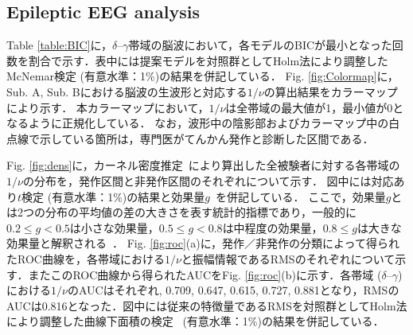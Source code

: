 \documentclass[journal]{IEEEtran}
\begin{document}
\subsection{Epileptic EEG analysis}
Table \ref{table:BIC}に，$\delta$--$\gamma$帯域の脳波において，各モデルのBICが最小となった回数を割合で示す．表中には提案モデルを対照群としてHolm法により調整したMcNemar検定 (有意水準：1\%)の結果を併記している．
Fig. \ref{fig:Colormap}に，Sub. A, Sub. Bにおける脳波の生波形と対応する$1/\nu$の算出結果をカラーマップにより示す．
本カラーマップにおいて，$1/\nu$は全帯域の最大値が1，最小値が0となるように正規化している．
なお，波形中の陰影部およびカラーマップ中の白点線で示している箇所は，専門医がてんかん発作と診断した区間である．

Fig. \ref{fig:dens}に，カーネル密度推定~\cite{Parzen1962}により算出した全被験者に対する各帯域の$1/\nu$の分布を，発作区間と非発作区間のそれぞれについて示す．
図中には対応あり$t$検定 (有意水準：1\%)の結果と効果量$g$~\cite{Hedges1981}を併記している．
ここで，効果量$g$とは2つの分布の平均値の差の大きさを表す統計的指標であり，一般的に$0.2 \leq g < 0.5$は小さな効果量，$0.5 \leq g < 0.8$は中程度の効果量，$0.8 \leq g$は大きな効果量と解釈される~\cite{Cohen2013}．
Fig. \ref{fig:roc}(a)に，発作／非発作の分類によって得られたROC曲線を，各帯域における$1/\nu$と振幅情報であるRMSのそれぞれについて示す．またこのROC曲線から得られたAUCをFig. \ref{fig:roc}(b)に示す．各帯域 ($\delta$--$\gamma$)における$1/\nu$のAUCはそれぞれ, 0.709, 0.647, 0.615, 0.727, 0.881となり，RMSのAUCは0.816となった．図中には従来の特徴量であるRMSを対照群としてHolm法により調整した曲線下面積の検定~\cite{Delong1988} (有意水準：1\%)の結果を併記している．
\end{document}

